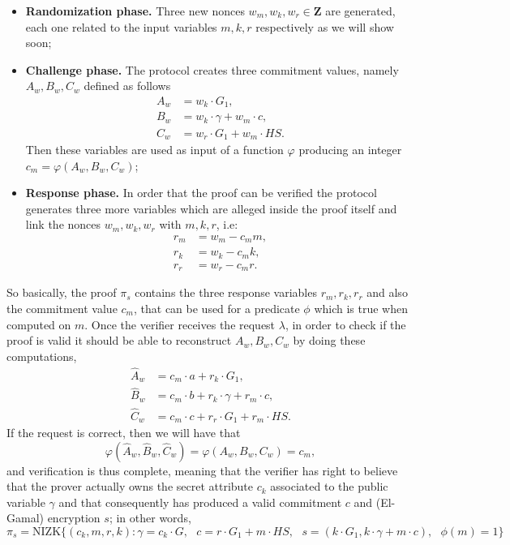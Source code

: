 \documentclass{article}
\begin{document}
\begin{itemize}
    \item \textbf{Randomization phase.} Three new nonces $w_m, w_k, w_r\in \mathbf{Z}$ are generated, each one related to the input variables $m, k, r$ respectively as we will show soon; 
    \item \textbf{Challenge phase.} The protocol creates three commitment values, namely $A_w, B_w, C_w$ defined as follows
    \begin{align*}
        A_w &= w_k\cdot G_1, \\ 
        B_w &= w_k\cdot\gamma + w_m\cdot c, \\
        C_w &= w_r\cdot G_1 + w_m \cdot HS.
    \end{align*}
    Then these variables are used as input of a function $\varphi$ producing an integer $c_m=\varphi(A_w,B_w,C_w)$;
    \item \textbf{Response phase.} In order that the proof can be verified the protocol generates three more variables which are alleged inside the proof itself and link the nonces $w_m, w_k, w_r$ with $m, k, r$, i.e:
    \begin{align*}
        r_m &= w_m - c_m m, \\
        r_k &= w_k - c_m k, \\
        r_r &= w_r - c_m r.
    \end{align*}
\end{itemize}
So basically, the proof $\pi_s$ contains the three response variables $r_m, r_k, r_r$ and also the commitment value $c_m$, that can be used for a predicate $\phi$ which is true when computed on $m$. Once the verifier receives the request $\lambda$, in order to check if the proof is valid it should be able to reconstruct  $A_w, B_w, C_w$ by doing these computations,
\begin{align*}
\widehat{A}_w &= c_m\cdot a + r_k\cdot G_1, \\
\widehat{B}_w &= c_m\cdot b + r_k\cdot \gamma + r_m\cdot c, \\
\widehat{C}_w &= c_m\cdot c + r_r\cdot G_1 + r_m\cdot HS.
\end{align*}
If the request is correct, then we will have that 
\[
\varphi(\widehat{A}_w,\widehat{B}_w,\widehat{C}_w) = \varphi(A_w,B_w,C_w) = c_m,
\]
and verification is thus complete, meaning that the verifier has right to believe that the prover actually owns the secret attribute $c_k$ associated to the public variable $\gamma$ and that consequently has produced a valid commitment $c$ and (El-Gamal) encryption $s$; in other words,
\[
\pi_s = \text{NIZK}\{(c_k, m, r, k): \gamma = c_k\cdot G, \text{ } c = r\cdot G_1 + m\cdot HS,\text{ } s = (k \cdot G_1, k\cdot \gamma + m\cdot c), \text{ } \phi(m)=1\}
\]
\end{document}
